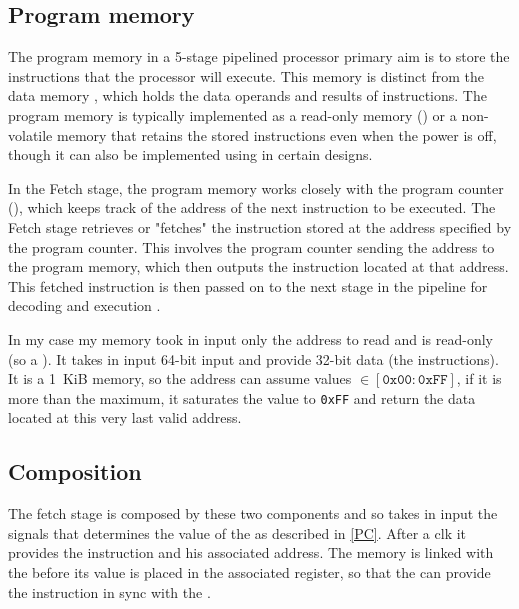 \documentclass{article}
\begin{document}
\subsection{Program memory}\label{P_MEM}
The program memory in a 5-stage pipelined \RISCV processor primary aim is to store the instructions that the processor will execute. 
This memory is distinct from the data memory , which holds the data operands and results of instructions. 
The program memory is typically implemented as a read-only memory (\ROM) or a non-volatile memory that retains 
the stored instructions even when the power is off, though it can also be implemented using \RAM in certain designs.

In the Fetch stage, the program memory works closely with the program counter (\PC), 
which keeps track of the address of the next instruction to be executed. 
The Fetch stage retrieves or "fetches" the instruction stored at the address specified by the program counter. 
This involves the program counter sending the address to the program memory, which then outputs the instruction located at that address. 
This fetched instruction is then passed on to the next stage in the pipeline for decoding and execution \cite{chatgpt}.

In my case my memory took in input only the address to read and is read-only (so a \ROM). 
It takes in input 64-bit input and provide 32-bit data (the instructions). 
It is a \SI{1}{KiB} memory, so the address can assume values $\in [\texttt{0x00}:\texttt{0xFF}]$, 
if it is more than the maximum, it saturates the value to \texttt{0xFF} and return the data located at this very last valid address.
    
\subsection*{Composition}

The fetch stage is composed by these two components and so takes in input the signals that determines 
the value of the \PC as described in \ref{PC}. After a \gls{clk} it provides the instruction and his associated address. 
The memory is linked with the \PC before its value is placed in the associated register, so that the \ROM 
can provide the instruction in sync with the \PC.
\end{document}
